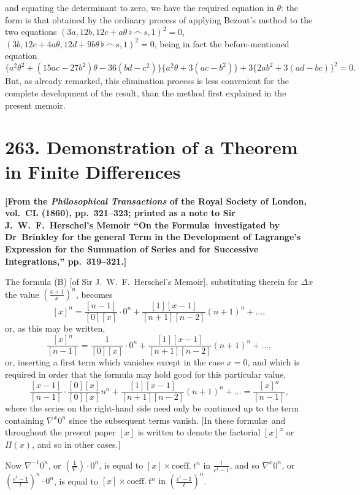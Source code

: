 \documentclass[11pt,a4paper]{article}
\theoremstyle{definition}
\begin{document}
and equating the determinant to zero, we have the required equation in $\theta$: the form is that obtained by the ordinary process of applying Bezout's method to the two equations $(3a,12b,12c+a\theta\,\flat\,\frown\, s,1)^2=0$, $(3b,12c+4a\theta,12d+9b\theta\,\flat\,\frown\, s,1)^2=0$, being in fact the before-mentioned equation
\[
\{a^2\theta^2+(15ac-27b^2)\theta-36(bd-c^2)\}\{a^2\theta+3(ac-b^2)\}+3\{2ab^2+3(ad-bc)\}^2=0.
\]
But, as already remarked, this elimination process is less convenient for the complete development of the result, than the method first explained in the present memoir.

\newpage
\section[263. Demonstration of a Theorem in Finite Differences]{263. Demonstration of a Theorem in Finite Differences}

\textbf{[From the \textit{Philosophical Transactions} of the Royal Society of London, vol.~CL (1860), pp.~321--323; printed as a note to Sir J.~W.~F.~Herschel's Memoir ``On the Formul\ae\ investigated by Dr~Brinkley for the general Term in the Development of Lagrange's Expression for the Summation of Series and for Successive Integrations,'' pp.~319--321.]}

The formula (B) [of Sir J.~W.~F.~Herschel's Memoir], substituting therein for $\Delta x$ the value $(\frac{x+1}{x})^n$, becomes
\[
[x]^n=\frac{[n-1]}{[0][x]}\cdot0^n+\frac{[1][x-1]}{[n+1][n-2]}(n+1)^n+\ldots,
\]
or, as this may be written,
\[
\frac{[x]^n}{[n-1]}=\frac{1}{[0][x]}\cdot0^n+\frac{[1][x-1]}{[n+1][n-2]}(n+1)^n+\ldots,
\]
or, inserting a first term which vanishes except in the case $x=0$, and which is required in order that the formula may hold good for this particular value,
\[
\frac{[x-1]}{[n-1]}\cdot\frac{[0][x]}{[0][x]}n^n+\frac{[1][x-1]}{[n+1][n-2]}(n+1)^n+\ldots=\frac{[x]^n}{[n-1]},
\]
where the series on the right-hand side need only be continued up to the term containing $\nabla^x0^n$ since the subsequent terms vanish. [In these formul\ae\ and throughout the present paper $[x]$ is written to denote the factorial $[x]^x$ or $\Pi(x)$, and so in other cases.]

Now $\nabla^{-1}0^n$, or $\left(\frac{1}{\nabla}\right)\cdot0^n$, is equal to $[x]\times\text{coeff.}\ t^n\text{ in }\frac{t}{e^t-1}$, and so $\nabla^x0^n$, or $\left(\frac{e^t-1}{t}\right)^n\cdot0^n$, is equal to $[x]\times\text{coeff.}\ t^n\text{ in }\left(\frac{e^t-1}{t}\right)^n$.
\end{document}
